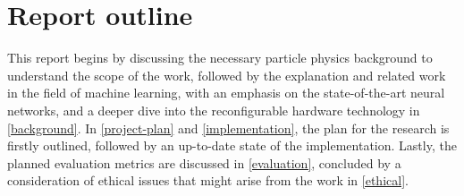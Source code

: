 \section{Report outline}
This report begins by discussing the necessary particle physics background to understand the scope of the work, followed by the explanation and related work in the field of machine learning, with an emphasis on the state-of-the-art neural networks, and a deeper dive into the reconfigurable hardware technology in \autoref{background}. In \autoref{project-plan} and \autoref{implementation}, the plan for the research is firstly outlined, followed by an up-to-date state of the implementation. Lastly, the planned evaluation metrics are discussed in \autoref{evaluation}, concluded by a consideration of ethical issues that might arise from the work in \autoref{ethical}.
